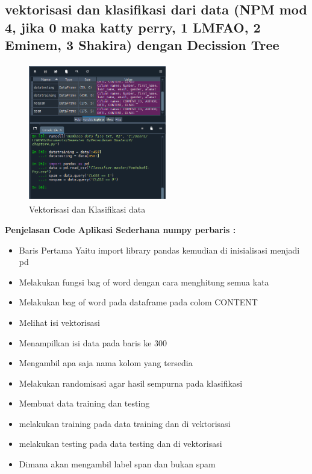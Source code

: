 \subsection{vektorisasi dan klasifikasi dari data (NPM mod 4, jika 0 maka katty
	perry, 1 LMFAO, 2 Eminem, 3 Shakira) dengan Decission Tree}
\begin{figure}[!htbp]
	\centering
	\includegraphics[width=6cm,height=6cm]{figures/Cp4-3.png}
	\caption{Vektorisasi dan Klasifikasi data}
	\label{penanda}
\end{figure}
\textbf{Penjelasan Code Aplikasi Sederhana numpy perbaris :}
\begin{itemize}
	\item Baris Pertama Yaitu import library pandas kemudian di inisialisasi menjadi pd
	\item Melakukan fungsi bag of word dengan cara menghitung semua kata
	\item Melakukan bag of word pada dataframe pada colom CONTENT
	\item Melihat isi vektorisasi
	\item Menampilkan isi data pada baris ke 300
	\item Mengambil apa saja nama kolom yang tersedia
	\item Melakukan randomisasi agar hasil sempurna pada klasifikasi
	\item Membuat data training dan testing
	\item melakukan training pada data training dan di vektorisasi
	\item melakukan testing pada data testing dan di vektorisasi
	\item Dimana akan mengambil label span dan bukan spam
\end{itemize}

